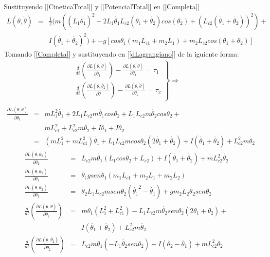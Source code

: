 \documentclass[11pt,spanish,lettersize]{article}
\begin{document}
Sustituyendo [\ref{CineticaTotal}] y [\ref{PotencialTotal}] en [\ref{Completa}]
\begin{eqnarray}
\nonumber L(\theta,\dot{\theta})&=&\frac{1}{2}(m((L_1\dot{\theta_1})^2+2L_1\dot{\theta_1}L_{c2}(\dot{\theta_1}+\dot{\theta_2})cos(\theta_2)+(L_{c2}(\dot{\theta_1}+\dot{\theta_2}))^2)+\\
\nonumber &&I(\dot{\theta_1}+\dot{\theta_2})^2)+-g[cos\theta_1(m_1L_{c1}+m_2L_1)+m_2L_{c2}cos(\theta_1+\theta_2)]
\end{eqnarray}
Tomando [\ref{Completa}] y sustituyendo en [\ref{dLagrangiano}] de la iguiente forma:
\begin{eqnarray}
\left.\begin{array}{c}
\frac{d}{dt}\left(\frac{\partial L(\theta,\dot{\theta})}{\partial\dot{\theta_1}}\right)-\frac{\partial L(\theta,\dot{\theta})}{\partial\theta_1}=\tau_1\\
\frac{d}{dt}\left(\frac{\partial L(\theta,\dot{\theta_2})}{\partial\dot{\theta}}\right)-\frac{\partial L(\theta,\dot{\theta})}{\partial\theta_2}=\tau_2
\end{array}\right\}\Rightarrow\\
\end{eqnarray}
\begin{eqnarray}
\nonumber\frac{\partial L(\theta,\dot{\theta})}{\partial\dot{\theta_1}}&=&mL_1^2\dot{\theta_1}+2L_1L_{c2}m\dot{\theta_1}cos\theta_2+L_1L_{c2}m\dot{\theta_2}cos\theta_2+\\
\nonumber&&mL_{c1}^2+L_{c2}^2m\dot{\theta_2}+I\dot{\theta_1}+I\dot{\theta_2}\\
&=&(mL_1^2+mL_{c1}^2)\dot{\theta_1}+L_1L_{c2}mcos\theta_2(2\dot{\theta_1}+\dot{\theta_2})+I(\dot{\theta_1}+\dot{\theta_2})+L_{c2}^2m\dot{\theta_2}\label{ParcialT1b}
\end{eqnarray}
\begin{eqnarray}
\frac{\partial L(\theta,\dot{\theta_2})}{\partial\dot{\theta_2}}&=&L_{c2}m\dot{\theta_1}(L_1cos\theta_2+L_{c2})+I(\dot{\theta_1}+\dot{\theta_2})+mL_{c2}^2\dot{\theta_2}\label{ParcialT2b}\\
\frac{\partial L(\theta,\dot{\theta_2})}{\partial\theta_1}&=&\dot{\theta_1}gsen\theta_1(m_1L_{c1}+m_2L_1+m_2L_2)\label{ParcialT1}\\
\frac{\partial L(\theta,\dot{\theta_2})}{\partial\theta_2}&=&\dot{\theta_2}L_1L_{c2}msen\theta_2(\dot{\theta_1}^2-\dot{\theta_1})+gm_2L_2\dot{\theta_2}sen\theta_2\label{ParcialT2}\\
\nonumber\frac{d}{dt}\left(\frac{\partial L(\theta,\dot{\theta})}{\partial\dot{\theta_1}}\right)&=&m\ddot{\theta_1}(L_1^2+L_{c1}^2)-L_1L_{c2}m\dot{\theta_2}sen\theta_2(2\ddot{\theta_1}+\ddot{\theta_2})+\\
&&I(\ddot{\theta_1}+\ddot{\theta_2})+L_{c2}^2m\ddot{\theta_2}\label{dtParcialT1b}\\
\frac{d}{dt}\left(\frac{\partial L(\theta,\dot{\theta_2})}{\partial\dot{\theta_2}}\right)&=&L_{c2}m\ddot{\theta_1}(-L_1\dot{\theta_2}sen\theta_2)+I(\ddot{\theta_2}-\ddot{\theta_1})+mL_{c2}^2\ddot{\theta_2}\label{dtparcialT2b}
\end{eqnarray}
\end{document}
